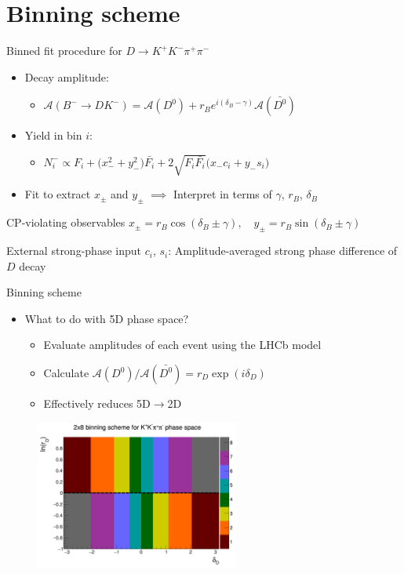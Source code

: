 \documentclass{beamer}
\begin{document}
\section{Binning scheme}
\begin{frame}{Binned fit procedure for $D\to K^+K^-\pi^+\pi^-$}
  \begin{itemize}
    \setlength\itemsep{1.0em}
    \item{Decay amplitude:}
    \begin{itemize}
      \item{$\mathcal{A}(B^-\to DK^-) = \mathcal{A}(D^0) + r_Be^{i(\delta_B - \gamma)}\mathcal{A}(\bar{D^0})$}
    \end{itemize}
    \item{Yield in bin $i$:}
    \begin{itemize}
      \item{$N^-_i\propto F_i + \big(x_-^2 + y_-^2\big)\bar{F_i} + 2\sqrt{F_i\bar{F_i}}\big(x_-c_i + y_-s_i\big)$}
    \end{itemize}
    \item{Fit to extract $x_\pm$ and $y_\pm$ $\implies$ Interpret in terms of $\gamma$, $r_B$, $\delta_B$}
  \end{itemize}
  \begin{block}{CP-violating observables}
    $x_\pm = r_B\cos(\delta_B\pm\gamma), \quad y_\pm = r_B\sin(\delta_B\pm\gamma)$
  \end{block}
  \begin{block}{External strong-phase input}
    $c_i$, $s_i$: Amplitude-averaged strong phase difference of $D$ decay
  \end{block}
\end{frame}

\begin{frame}{Binning scheme}
  \begin{itemize}
    \item{What to do with 5D phase space?}
    \begin{itemize}
      \item{Evaluate amplitudes of each event using the LHCb model}
      \item{Calculate $\mathcal{A}(D^0)/\mathcal{A}(\bar{D^0}) = r_D\exp(i\delta_D)$}
      \item{Effectively reduces 5D$\to$2D}
    \end{itemize}
  \end{itemize}
  \begin{figure}
    \centering
    \includegraphics[width = 0.6\textwidth]{../Report/Plots/BinningSchemePlot.png}
  \end{figure}
\end{frame}
\end{document}
